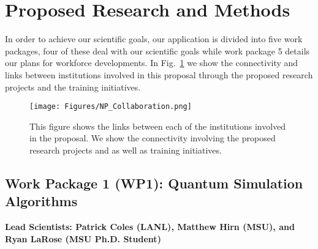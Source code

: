 \documentclass[11pt]{article}
\begin{document}
%


\section{Proposed Research and Methods}

In order to achieve our scientific goals, our application is divided into five work packages, four of these deal with our scientific goals while work package 5 details our plans for workforce developments.  In Fig.~\ref{diagram} we show the connectivity and links between institutions involved in this proposal through the proposed research projects and the training initiatives.

\begin{figure}[hbt]
\begin{center}
 \texttt{[image: Figures/NP\_Collaboration.png]}
 \caption{This figure shows the links between each of the institutions involved in the proposal.  We show the connectivity involving the proposed research projects and as well as training initiatives.}
 \label{diagram}
 \end{center}
\end{figure}


\subsection{Work Package 1 (WP1): Quantum Simulation Algorithms}

{\bf Lead Scientists: Patrick Coles (LANL), Matthew Hirn (MSU), and Ryan LaRose (MSU Ph.D. Student)}
\end{document}
